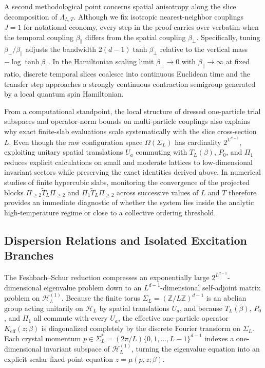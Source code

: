 \documentclass[11pt]{article}
\theoremstyle{definition}
\begin{document}
A second methodological point concerns spatial anisotropy along the slice
decomposition of $\Lambda_{L,T}$. Although we fix isotropic nearest-neighbor
couplings $J = 1$ for notational economy, every step in the proof carries over
verbatim when the temporal coupling $\beta_\parallel$ differs from the spatial
coupling $\beta_\perp$. Specifically, tuning $\beta_\perp / \beta_\parallel$ adjusts
the bandwidth $2(d-1)\tanh\beta_\perp$ relative to the vertical mass
$-\log\tanh\beta_\parallel$. In the Hamiltonian scaling limit $\beta_\perp \to 0$
with $\beta_\parallel \to \infty$ at fixed ratio, discrete temporal slices coalesce
into continuous Euclidean time and the transfer step approaches a strongly
continuous contraction semigroup generated by a local quantum spin Hamiltonian.

From a computational standpoint, the local structure of dressed one-particle trial
subspaces and operator-norm bounds on multi-particle couplings also explains why
exact finite-slab evaluations scale systematically with the slice cross-section $L$.
Even though the raw configuration space $\Omega(\Sigma_L)$ has cardinality
$2^{L^{d-1}}$, exploiting unitary spatial translations $U_a$ commuting with
$T_L(\beta)$, $P_0$, and $\Pi_1$ reduces explicit calculations on small and moderate
lattices to low-dimensional invariant sectors while preserving the exact identities
derived above. In numerical studies of finite hypercubic slabs, monitoring the
convergence of the projected blocks $\Pi_{\ge 2} \widetilde{T}_L \Pi_{\ge 2}$ and
$\Pi_1 \widetilde{T}_L \Pi_{\ge 2}$ across successive values of $L$ and $T$
therefore provides an immediate diagnostic of whether the system lies inside the
analytic high-temperature regime or close to a collective ordering threshold.

\subsection{Dispersion Relations and Isolated Excitation Branches}
\label{subsec:s07b}

The Feshbach--Schur reduction compresses an exponentially large
$2^{L^{d-1}}$-dimensional eigenvalue problem down to an $L^{d-1}$-dimensional
self-adjoint matrix problem on $\mathcal{H}_L^{(1)}$. Because the finite torus
$\Sigma_L = (\mathbb{Z}/L\mathbb{Z})^{d-1}$ is an abelian group acting unitarily on
$\mathcal{H}_L$ by spatial translations $U_a$, and because $T_L(\beta)$, $P_0$, and
$\Pi_1$ all commute with every $U_a$, the effective one-particle operator
$K_{\mathrm{eff}}(z; \beta)$ is diagonalized completely by the discrete Fourier
transform on $\Sigma_L$. Each crystal momentum $p \in \Sigma_L^* = (2\pi / L) \{0,
1, \dots, L-1\}^{d-1}$ indexes a one-dimensional invariant subspace of
$\mathcal{H}_L^{(1)}$, turning the eigenvalue equation into an explicit scalar
fixed-point equation $z = \mu(p, z; \beta)$.
\end{document}
